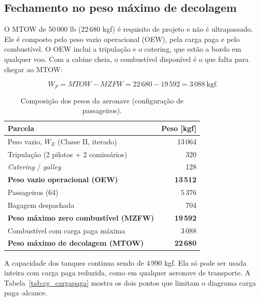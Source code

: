\subsection{Fechamento no peso máximo de decolagem}
\label{sec:cg_fechamento}
O MTOW de 50\,000 lb (22\,680 kgf) é requisito de projeto e não é ultrapassado. Ele é composto pelo peso vazio operacional (OEW), pela carga paga e pelo combustível. O OEW inclui a tripulação e o catering, que estão a bordo em qualquer voo. Com a cabine cheia, o combustível disponível é o que falta para chegar ao MTOW:

\begin{equation}
W_{F} = MTOW - MZFW = 22\,680 - 19\,592 = 3\,088 \ \text{kgf}.
\label{eq:cg_combustivel}
\end{equation}

\begin{table}[H]
  \centering
  \linespread{1}\small
  \setlength{\tabcolsep}{4pt}
  \caption{Composição dos pesos da aeronave (configuração de passageiros).}
  \label{tab:cg_pesos}
  \begin{tabularx}{\textwidth}{>{\raggedright\arraybackslash}X r}
    \toprule
    \textbf{Parcela} & \textbf{Peso [kgf]} \\
    \midrule
    Peso vazio, $W_E$ (Classe II, iterado) & 13\,064 \\
    Tripulação (2 pilotos + 2 comissários) & 320 \\
    \emph{Catering} / \emph{galley} & 128 \\
    \textbf{Peso vazio operacional (OEW)} & \textbf{13\,512} \\
    Passageiros (64) & 5\,376 \\
    Bagagem despachada & 704 \\
    \textbf{Peso máximo zero combustível (MZFW)} & \textbf{19\,592} \\
    Combustível com carga paga máxima & 3\,088 \\
    \textbf{Peso máximo de decolagem (MTOW)} & \textbf{22\,680} \\
    \bottomrule
  \end{tabularx}
\end{table}

A capacidade dos tanques continua sendo de 4\,990 kgf. Ela só pode ser usada inteira com carga paga reduzida, como em qualquer aeronave de transporte. A Tabela~\ref{tab:cg_cargapaga} mostra os dois pontos que limitam o diagrama carga paga--alcance.


